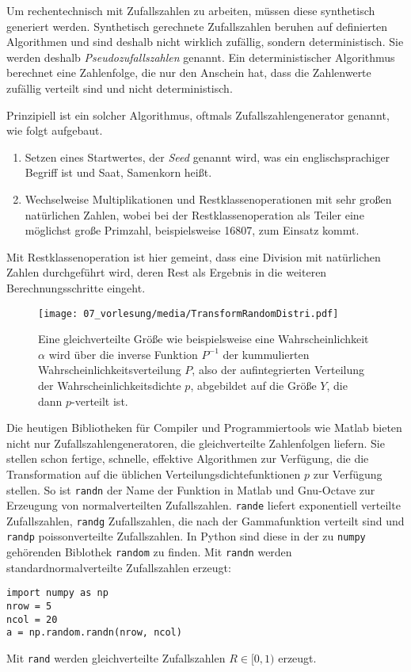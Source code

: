 Um rechentechnisch mit Zufallszahlen zu arbeiten, müssen diese synthetisch generiert werden.
Synthetisch gerechnete Zufallszahlen beruhen auf definierten Algorithmen und
sind deshalb nicht wirklich zufällig, sondern deterministisch. Sie werden deshalb
\textsl{Pseudozufallszahlen} genannt.
Ein deterministischer Algorithmus berechnet eine Zahlenfolge, die nur den
Anschein hat, dass die Zahlenwerte zufällig verteilt sind und nicht deterministisch.

Prinzipiell ist ein solcher Algorithmus, oftmals Zufallszahlengenerator genannt, wie
folgt aufgebaut.
\begin{enumerate}
\item Setzen eines Startwertes, der \textsl{Seed} genannt wird, was ein englischsprachiger
  Begriff ist und Saat, Samenkorn heißt.
\item Wechselweise Multiplikationen und Restklassenoperationen mit sehr großen natürlichen Zahlen, wobei
  bei der Restklassenoperation als Teiler eine möglichst große Primzahl, beispielsweise
  16807, zum Einsatz kommt.
\end{enumerate}
Mit Restklassenoperation ist hier gemeint, dass eine Division mit natürlichen Zahlen
durchgeführt wird, deren Rest als Ergebnis in die weiteren Berechnungsschritte eingeht.


\begin{figure}
\begin{center}
\texttt{[image: 07\_vorlesung/media/TransformRandomDistri.pdf]}
\caption{\label{pverteilteZufallszahlen} Eine gleichverteilte Größe wie beispielsweise
eine Wahrscheinlichkeit $\alpha$ wird über die inverse Funktion $P^{-1}$ der
kummulierten Wahrscheinlichkeitsverteilung $P$, also der aufintegrierten Verteilung
der Wahrscheinlichkeitsdichte $p$, abgebildet auf die Größe $Y$, die dann $p$-verteilt ist.}
\end{center}
\end{figure}
Die heutigen Bibliotheken für Compiler und Programmiertools wie Matlab bieten nicht nur
Zufallszahlengeneratoren, die gleichverteilte Zahlenfolgen liefern. Sie stellen schon
fertige, schnelle, effektive Algorithmen zur Verfügung, die die Transformation auf die üblichen
Verteilungsdichtefunktionen $p$ zur Verfügung stellen. So ist \texttt{randn} der Name der Funktion
in Matlab und Gnu-Octave zur Erzeugung von normalverteilten Zufallszahlen. \texttt{rande}
liefert exponentiell verteilte Zufallszahlen, \texttt{randg} Zufallszahlen, die nach
der Gammafunktion verteilt sind und \texttt{randp} poissonverteilte Zufallszahlen. In Python sind
diese in der zu \texttt{numpy} gehörenden Biblothek \texttt{random} zu finden. Mit
\texttt{randn} werden standardnormalverteilte Zufallszahlen erzeugt:
\begin{lstlisting}[style=Python]
import numpy as np
nrow = 5
ncol = 20
a = np.random.randn(nrow, ncol)
\end{lstlisting}
Mit \texttt{rand} werden gleichverteilte Zufallszahlen $R \in [0, 1)$ erzeugt.

